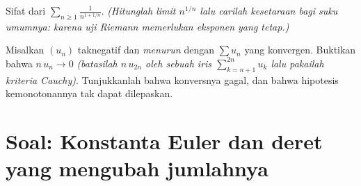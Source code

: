 \begin{exercise}[$\star\star$]\label{exo:b1:series:11}
Sifat dari $\displaystyle\sum_{n \geq 1} \frac{1}{n^{1 + 1/n}}$.
\emph{(Hitunglah limit $n^{1/n}$ lalu carilah kesetaraan bagi
suku umumnya: karena uji Riemann memerlukan eksponen yang \emph{tetap}.)}
\end{exercise}

\begin{exercise}[$\star\star\star$]\label{exo:b1:series:12}
Misalkan $(u_n)$ taknegatif dan \emph{menurun} dengan $\sum u_n$
yang konvergen. Buktikan bahwa $n\,u_n \to 0$ \emph{(batasilah $n\,u_{2n}$
oleh sebuah iris $\sum_{k=n+1}^{2n} u_k$ lalu pakailah kriteria
Cauchy)}. Tunjukkanlah bahwa konversnya gagal, dan bahwa
hipotesis kemonotonannya tak dapat dilepaskan.
\end{exercise}

\section{Soal: Konstanta Euler dan deret yang mengubah
jumlahnya}

